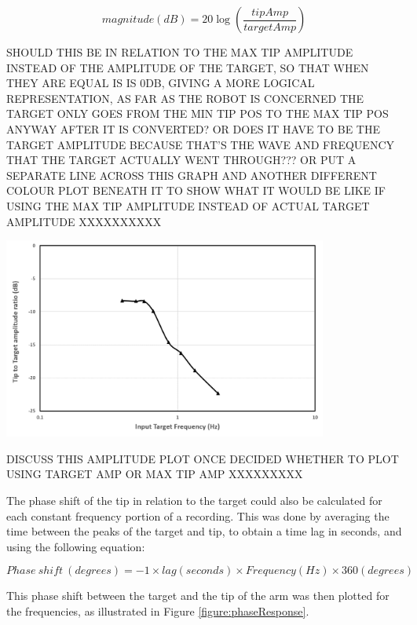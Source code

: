 \documentclass[11pt]{article}
\begin{document}
\begin{equation}
magnitude(dB) = 20\log \left(\frac{tipAmp}{targetAmp}\right)
\end{equation}

SHOULD THIS BE IN RELATION TO THE MAX TIP AMPLITUDE INSTEAD OF THE AMPLITUDE OF THE TARGET, SO THAT WHEN THEY ARE EQUAL IS IS 0DB, GIVING A MORE LOGICAL REPRESENTATION, AS FAR AS THE ROBOT IS CONCERNED THE TARGET ONLY GOES FROM THE MIN TIP POS TO THE MAX TIP POS ANYWAY AFTER IT IS CONVERTED? OR DOES IT HAVE TO BE THE TARGET AMPLITUDE BECAUSE THAT'S THE WAVE AND FREQUENCY THAT THE TARGET ACTUALLY WENT THROUGH??? OR PUT A SEPARATE LINE ACROSS THIS GRAPH AND ANOTHER DIFFERENT COLOUR PLOT BENEATH IT TO SHOW WHAT IT WOULD BE LIKE IF USING THE MAX TIP AMPLITUDE INSTEAD OF ACTUAL TARGET AMPLITUDE XXXXXXXXXX

\begin{center}
\includegraphics[width=0.8\textwidth]{images/amplitudeResponse.png}
\label{figure:amplitudeResponse}
\end{center}

DISCUSS THIS AMPLITUDE PLOT ONCE DECIDED WHETHER TO PLOT USING TARGET AMP OR MAX TIP AMP XXXXXXXXX


\pagebreak
The phase shift of the tip in relation to the target could also be calculated for each constant frequency portion of a recording. This was done by averaging the time between the peaks of the target and tip, to obtain a time lag in seconds, and using the following equation:

\begin{equation}\label{equation:phaseShift}
Phase \ shift \ (degrees) = -1 \times lag(seconds)\times Frequency(Hz)\times 360(degrees)
\end{equation}

This phase shift between the target and the tip of the arm was then plotted for the frequencies, as illustrated in Figure \ref{figure:phaseResponse}.
\end{document}
